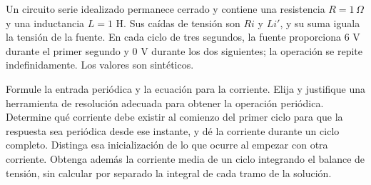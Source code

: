 Un circuito serie idealizado permanece cerrado y contiene una resistencia \(R=1\,\Omega\) y una inductancia \(L=1\) H. Sus caídas de tensión son \(Ri\) y \(Li'\), y su suma iguala la tensión de la fuente. En cada ciclo de tres segundos, la fuente proporciona \(6\) V durante el primer segundo y \(0\) V durante los dos siguientes; la operación se repite indefinidamente. Los valores son sintéticos.

Formule la entrada periódica y la ecuación para la corriente. Elija y justifique una herramienta de resolución adecuada para obtener la operación periódica. Determine qué corriente debe existir al comienzo del primer ciclo para que la respuesta sea periódica desde ese instante, y dé la corriente durante un ciclo completo. Distinga esa inicialización de lo que ocurre al empezar con otra corriente. Obtenga además la corriente media de un ciclo integrando el balance de tensión, sin calcular por separado la integral de cada tramo de la solución.
